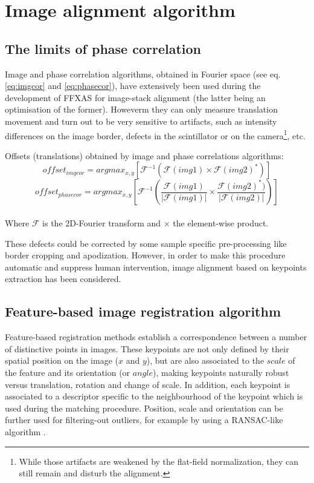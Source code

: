 \documentclass[preprint]{iucr}
\begin{document}
\section{Image alignment algorithm}

\subsection{The limits of phase correlation}

Image and phase correlation algorithms, obtained in Fourier space (see eq.
\ref{eq:imgcor} and \ref{eq:phasecor}), have
extensively been used during the development of FFXAS for image-stack alignment
(the latter being an optimisation of the former). Howeverm they can only
measure translation movement and turn out to be very sensitive to
artifacts, such as intensity differences on the image border, defects in the
scintillator or on the camera\footnote{While those artifacts are weakened by
the flat-field normalization, they can still remain and disturb the alignment.},
etc.

\begin{center}
Offsets (translations) obtained by image and phase correlations algorithms:
\begin{equation}
\label{eq:imgcor}
offset_{img cor} =
argmax_{x,y}[\mathcal{F}^{-1}(\mathcal{F}(img1)\times\mathcal{F}(img2)^*)]
\end{equation}
\begin{equation}
\label{eq:phasecor}
offset_{phase cor} =
argmax_{x,y}[\mathcal{F}^{-1}(\frac{\mathcal{F}(img1)}{|\mathcal{F}(img1)|}
\times\frac{\mathcal{F}(img2)^*)}{|\mathcal{F}(img2)|})]
\end{equation}
\\Where $\mathcal{F}$ is the 2D-Fourier transform and $\times$ the element-wise
product.
\end{center}

These defects could be corrected by some sample
specific pre-processing like border cropping and apodization.
However, in order to make this procedure automatic and suppress human
intervention, image alignment based on keypoints extraction has been
considered.

\subsection{Feature-based image registration algorithm}

Feature-based registration methods establish a correspondence between a
number of distinctive points in images.
These keypoints are not only defined by their spatial position on the image
($x$ and $y$), but are also associated to the $scale$ of the feature and its
orientation (or $angle$),
making keypoints naturally robust versus
translation, rotation and change of scale.
In addition, each keypoint is associated to a descriptor specific to the
neighbourhood of the keypoint which is used during the matching procedure.
Position, scale and orientation can be further used for filtering-out outliers,
for example by using a RANSAC-like algorithm \cite{orsa}.
\end{document}

